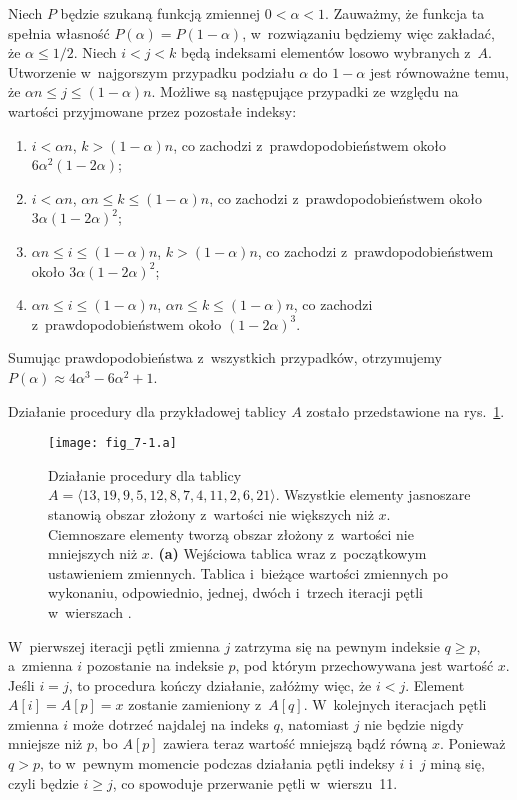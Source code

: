 \exercise %
Niech $P$ będzie szukaną funkcją zmiennej $0<\alpha<1$. Zauważmy, że funkcja ta spełnia własność $P(\alpha)=P(1-\alpha)$, w~rozwiązaniu będziemy więc zakładać, że $\alpha\le1/2$. Niech $i<j<k$ będą indeksami elementów losowo wybranych z~$A$. Utworzenie w~najgorszym przypadku podziału $\alpha$ do $1-\alpha$ jest równoważne temu, że $\alpha n\le j\le(1-\alpha)n$. Możliwe są następujące przypadki ze względu na wartości przyjmowane przez pozostałe indeksy:
\begin{enumerate}
	\renewcommand{\labelenumi}{(\roman{enumi})}
	\item $i<\alpha n$, $k>(1-\alpha)n$, co zachodzi z~prawdopodobieństwem około $6\alpha^2(1-2\alpha)$;
	\item $i<\alpha n$, $\alpha n\le k\le(1-\alpha)n$, co zachodzi z~prawdopodobieństwem około $3\alpha(1-2\alpha)^2$;
	\item $\alpha n\le i\le(1-\alpha)n$, $k>(1-\alpha)n$, co zachodzi z~prawdopodobieństwem około $3\alpha(1-2\alpha)^2$;
	\item $\alpha n\le i\le(1-\alpha)n$, $\alpha n\le k\le(1-\alpha)n$, co zachodzi z~prawdopodobieństwem około $(1-2\alpha)^3$.
\end{enumerate}
Sumując prawdopodobieństwa z~wszystkich przypadków, otrzymujemy $P(\alpha)\approx4\alpha^3-6\alpha^2+1$.

\problems


\subproblem %
Działanie procedury  dla przykładowej tablicy $A$ zostało przedstawione na rys.~\ref{fig:7-1a}.
\begin{figure}[ht]
	\begin{center}
		\texttt{[image: fig\_7-1.a]}
	\end{center}
	\caption{Działanie procedury  dla tablicy $A=\langle13,19,9,5,12,8,7,4,11,2,6,21\rangle$. Wszystkie elementy jasnoszare stanowią obszar złożony z~wartości nie większych niż $x$. Ciemnoszare elementy tworzą obszar złożony z~wartości nie mniejszych niż $x$. {\sffamily\bfseries(a)} Wejściowa tablica wraz z~początkowym ustawieniem zmiennych. {\sffamily\bfseries{}} Tablica i~bieżące wartości zmiennych po wykonaniu, odpowiednio, jednej, dwóch i~trzech iteracji pętli  w~wierszach .} \label{fig:7-1a}
\end{figure}

\subproblem %
W~pierwszej iteracji pętli  zmienna $j$ zatrzyma się na pewnym indeksie $q\ge p$, a~zmienna $i$ pozostanie na indeksie $p$, pod którym przechowywana jest wartość $x$. Jeśli $i=j$, to procedura kończy działanie, załóżmy więc, że $i<j$. Element $A[i]=A[p]=x$ zostanie zamieniony z~$A[q]$. W~kolejnych iteracjach pętli  zmienna $i$ może dotrzeć najdalej na indeks $q$, natomiast $j$ nie będzie nigdy mniejsze niż $p$, bo $A[p]$ zawiera teraz wartość mniejszą bądź równą $x$. Ponieważ $q>p$, to w~pewnym momencie podczas działania pętli indeksy $i$ i~$j$ miną się, czyli będzie $i\ge j$, co spowoduje przerwanie pętli w~wierszu~11.

